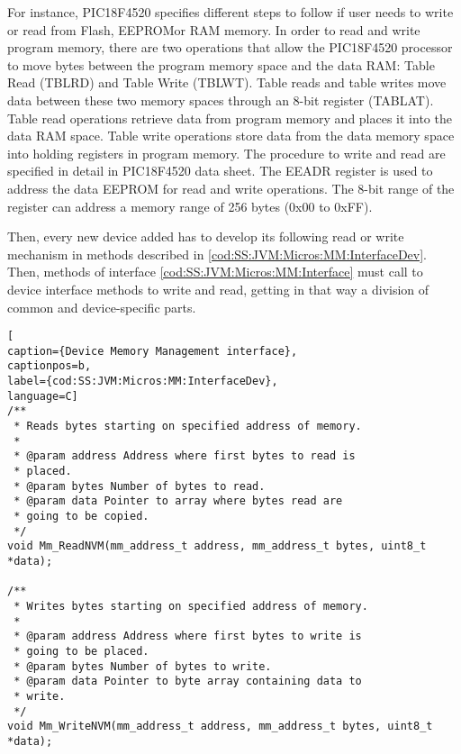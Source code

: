 For instance, PIC18F4520 specifies different steps to follow if user needs to write or read from Flash, EEPROMor RAM memory. In order to read and write program memory, there are two operations that allow the PIC18F4520 processor to move bytes between the program memory space and the data RAM: Table Read (TBLRD) and Table Write (TBLWT). Table reads and table writes move data between these two memory spaces through an 8-bit register (TABLAT). Table read operations retrieve data from program memory and places it into the data RAM space. Table write operations store data from the data memory space into holding registers in program memory. The procedure to write and read are specified in detail in PIC18F4520 data sheet. The EEADR register is used to address the data EEPROM for read and write operations. The 8-bit range of the register can address a memory range of 256 bytes (0x00 to 0xFF).


Then, every new device added has to develop its following read or write mechanism in  methods described in \ref{cod:SS:JVM:Micros:MM:InterfaceDev}. Then, methods of interface \ref{cod:SS:JVM:Micros:MM:Interface} must call to device interface methods to write and read, getting in that way a division of common and device-specific parts.

\medskip
\begin{lstlisting}[
caption={Device Memory Management interface},
captionpos=b,
label={cod:SS:JVM:Micros:MM:InterfaceDev},
language=C]
/**
 * Reads bytes starting on specified address of memory.
 *
 * @param address Address where first bytes to read is
 * placed.
 * @param bytes Number of bytes to read.
 * @param data Pointer to array where bytes read are
 * going to be copied.
 */
void Mm_ReadNVM(mm_address_t address, mm_address_t bytes, uint8_t *data);

/**
 * Writes bytes starting on specified address of memory.
 *
 * @param address Address where first bytes to write is
 * going to be placed.
 * @param bytes Number of bytes to write.
 * @param data Pointer to byte array containing data to
 * write.
 */
void Mm_WriteNVM(mm_address_t address, mm_address_t bytes, uint8_t *data);
\end{lstlisting}
\medskip

